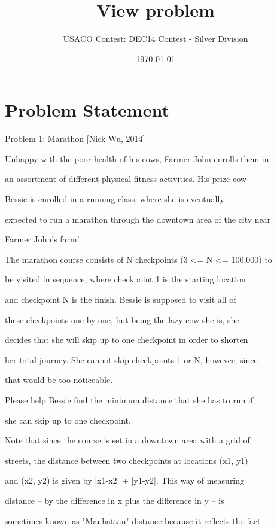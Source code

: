 \documentclass[12pt]{article}
\title{View problem}
\author{USACO Contest: DEC14 Contest - Silver Division}
\date{\today}
\begin{document}
\maketitle

\section*{Problem Statement}

Problem 1: Marathon [Nick Wu, 2014]



Unhappy with the poor health of his cows, Farmer John enrolls them in

an assortment of different physical fitness activities.  His prize cow

Bessie is enrolled in a running class, where she is eventually

expected to run a marathon through the downtown area of the city near

Farmer John's farm!



The marathon course consists of N checkpoints (3 <= N <= 100,000) to

be visited in sequence, where checkpoint 1 is the starting location

and checkpoint N is the finish.  Bessie is supposed to visit all of

these checkpoints one by one, but being the lazy cow she is, she

decides that she will skip up to one checkpoint in order to shorten

her total journey.  She cannot skip checkpoints 1 or N, however, since

that would be too noticeable.



Please help Bessie find the minimum distance that she has to run if

she can skip up to one checkpoint.  



Note that since the course is set in a downtown area with a grid of

streets, the distance between two checkpoints at locations (x1, y1)

and (x2, y2) is given by |x1-x2| + |y1-y2|.  This way of measuring

distance -- by the difference in x plus the difference in y -- is

sometimes known as "Manhattan" distance because it reflects the fact
\end{document}
